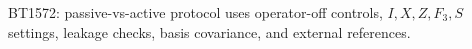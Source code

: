 \begin{center}\small
BT1572: passive-vs-active protocol uses operator-off controls, $I,X,Z,F_3,S$ settings, leakage checks, basis covariance, and external references.
\end{center}
